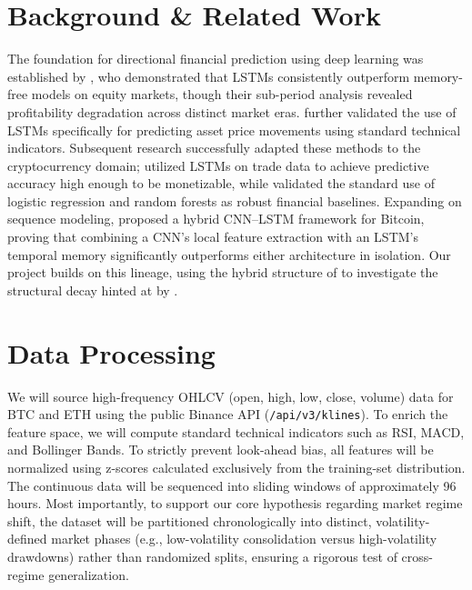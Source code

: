 \documentclass{article}
\begin{document}
\section{Background \& Related Work}
The foundation for directional financial prediction using deep learning was established by
\citet{fischer2018deep}, who demonstrated that LSTMs consistently outperform memory-free models on
equity markets, though their sub-period analysis revealed profitability degradation across distinct
market eras. \citet{nelson2017stock} further validated the use of LSTMs specifically for predicting
asset price movements using standard technical indicators. Subsequent research successfully adapted
these methods to the cryptocurrency domain; \citet{zhao2021deep} utilized LSTMs on trade data to
achieve predictive accuracy high enough to be monetizable, while \citet{ghosh2020forecasting} validated
the standard use of logistic regression and random forests as robust financial baselines. Expanding on
sequence modeling, \citet{guo2021mrclstm} proposed a hybrid CNN--LSTM framework for Bitcoin, proving
that combining a CNN's local feature extraction with an LSTM's temporal memory significantly
outperforms either architecture in isolation. Our project builds on this lineage, using the hybrid
structure of \citet{guo2021mrclstm} to investigate the structural decay hinted at by
\citet{fischer2018deep}.

\section{Data Processing}
We will source high-frequency OHLCV (open, high, low, close, volume) data for BTC and ETH using the
public Binance API (\texttt{/api/v3/klines}). To enrich the feature space, we will compute standard
technical indicators such as RSI, MACD, and Bollinger Bands. To strictly prevent look-ahead bias, all
features will be normalized using z-scores calculated exclusively from the training-set distribution.
The continuous data will be sequenced into sliding windows of approximately 96 hours. Most importantly,
to support our core hypothesis regarding market regime shift, the dataset will be partitioned
chronologically into distinct, volatility-defined market phases (e.g., low-volatility consolidation
versus high-volatility drawdowns) rather than randomized splits, ensuring a rigorous test of
cross-regime generalization.
\end{document}
